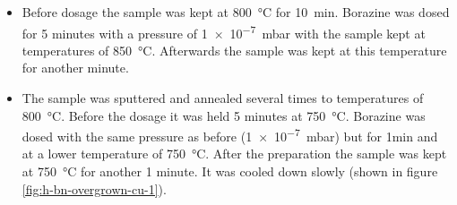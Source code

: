 \begin{itemize}
 \item Before dosage the sample was kept at \SI{800}{\celsius} for \SI{10}{\minute}.
Borazine was dosed for 5 minutes with a pressure of \SI{1e-7}{\milli \bar} with the sample kept at temperatures of \SI{850}{\celsius}. Afterwards the sample was kept at this temperature for another minute.
\end{itemize}
\begin{itemize}
 \item The sample was sputtered and annealed several times to temperatures of \SI{800}{\celsius}. Before the dosage it was held 5 minutes at \SI{750}{\celsius}. Borazine was dosed with the same pressure as before (\SI{1e-7}{\milli \bar}) but for 1min and at a lower temperature of \SI{750}{\celsius}. After the preparation the sample was kept at \SI{750}{\celsius} for another 1 minute. It was cooled down slowly (shown in figure \ref{fig:h-bn-overgrown-cu-1}).
\end{itemize}

